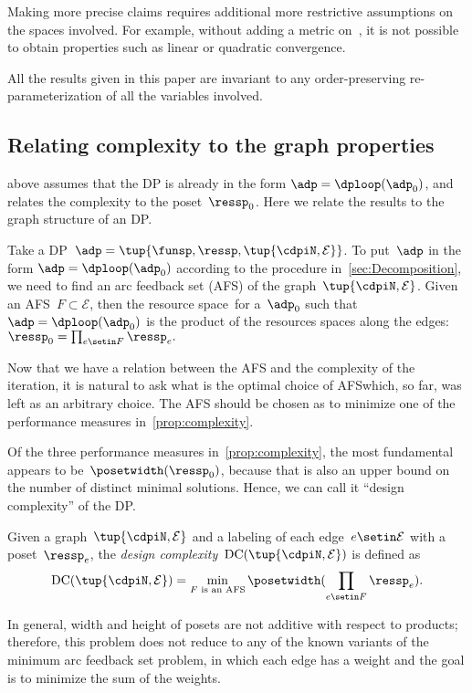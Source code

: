 \begin{remark}
    Making more precise claims requires additional more restrictive assumptions on the spaces involved.
    For example, without adding a metric on~\ressp, it is not possible to obtain properties such as linear or quadratic convergence.
\end{remark}

\begin{remark}
    All the results given in this paper are invariant to any order-preserving re-parameterization of all the variables involved.
\end{remark}

\subsection{Relating complexity to the graph properties}

 above assumes that the DP is already in the form $\adp=\dploop(\adp_{0})$, and relates the complexity to the poset~$\ressp_{0}$.
Here we relate the results to the graph structure of an DP.

Take a DP~$\adp=\tup{ \funsp,\ressp,\tup{ \cdpiN,\mathcal{E}} } $.
To put~$\adp$ in the form $\adp=\dploop(\adp_{0})$ according to the procedure in~\cref{sec:Decomposition}, we need to find an arc feedback set (AFS) of the graph~$\tup{ \cdpiN,\mathcal{E}} $.
Given an AFS~$F\subset\mathcal{E}$, then the resource space~\ressp for a~$\adp_{0}$ such that~$\adp=\dploop(\adp_{0})$ is the product of the resources spaces along the edges: $\ressp_{0}=\prod_{e\setin F}\ressp_{e}.$

Now that we have a relation between the AFS and the complexity of the iteration, it is natural to ask what is the optimal choice of AFS\textemdash which, so far, was left as an arbitrary choice.
The AFS should be chosen as to minimize one of the performance measures in~\cref{prop:complexity}.

Of the three performance measures in~\cref{prop:complexity}, the most fundamental appears to be~$\posetwidth(\ressp_{0})$, because that is also an upper bound on the number of distinct minimal solutions.
Hence, we can call it ``design complexity'' of the DP.
\begin{definition}
    \label{def:design-complexity}
    Given a graph~$\tup{ \cdpiN,\mathcal{E}}$ and a labeling of each edge~$e\setin\mathcal{E}$ with a poset~$\ressp_{e}$, the \emph{design complexity}~$\text{DC}(\tup{ \cdpiN,\mathcal{E}} )$ is defined as
    \begin{equation}
        \text{DC}(\tup{ \cdpiN,\mathcal{E}} )=\min_{F\text{ is an AFS}}\posetwidth(\prod_{e\setin F}\ressp_{e}).
        \label{eq:complexity}
    \end{equation}
\end{definition}
In general, width and height of posets are not additive with respect to products; therefore, this problem does not reduce to any of the known variants of the minimum arc feedback set problem, in which each edge has a weight and the goal is to minimize the sum of the weights.

